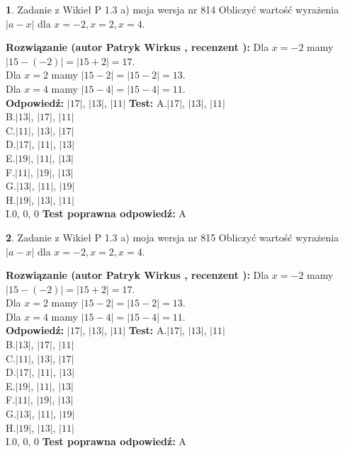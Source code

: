 \documentclass[12pt, a4paper]{article}
\theoremstyle{definition} %
\newtheorem{zad}{}
\newcommand{\zadStart}[1]{\begin{zad}#1\newline}
\newcommand{\zadStop}{\end{zad}}
\newcommand{\rozwStart}[2]{\noindent \textbf{Rozwiązanie (autor #1 , recenzent #2): }\newline}
\newcommand{\rozwStop}{\newline}
\newcommand{\odpStart}{\noindent \textbf{Odpowiedź:}\newline}
\newcommand{\odpStop}{\newline}
\newcommand{\testStart}{\noindent \textbf{Test:}\newline}
\newcommand{\testStop}{\newline}
\newcommand{\kluczStart}{\noindent \textbf{Test poprawna odpowiedź:}\newline}
\newcommand{\kluczStop}{\newline}
\begin{document}
\zadStart{Zadanie z Wikieł P 1.3 a) moja wersja nr 814}
Obliczyć wartość wyrażenia $|a - x|$ dla $x=-2,x=2,x=4$.
\zadStop
\rozwStart{Patryk Wirkus}{}
Dla $x = -2$ mamy $|15 - (-2)| = |15 + 2| = 17$.\\
Dla $x = 2$ mamy $|15 - 2| = |15 - 2| = 13$.\\
Dla $x = 4$ mamy $|15 - 4| = |15 - 4| = 11$.\\
\rozwStop
\odpStart
$|17|$, $|13|$, $|11|$
\odpStop
\testStart
A.$|17|$, $|13|$, $|11|$\\
B.$|13|$, $|17|$, $|11|$\\
C.$|11|$, $|13|$, $|17|$\\
D.$|17|$, $|11|$, $|13|$\\
E.$|19|$, $|11|$, $|13|$\\
F.$|11|$, $|19|$, $|13|$\\
G.$|13|$, $|11|$, $|19|$\\
H.$|19|$, $|13|$, $|11|$\\
I.$0$, $0$, $0$
\testStop
\kluczStart
A
\kluczStop



\zadStart{Zadanie z Wikieł P 1.3 a) moja wersja nr 815}
Obliczyć wartość wyrażenia $|a - x|$ dla $x=-2,x=2,x=4$.
\zadStop
\rozwStart{Patryk Wirkus}{}
Dla $x = -2$ mamy $|15 - (-2)| = |15 + 2| = 17$.\\
Dla $x = 2$ mamy $|15 - 2| = |15 - 2| = 13$.\\
Dla $x = 4$ mamy $|15 - 4| = |15 - 4| = 11$.\\
\rozwStop
\odpStart
$|17|$, $|13|$, $|11|$
\odpStop
\testStart
A.$|17|$, $|13|$, $|11|$\\
B.$|13|$, $|17|$, $|11|$\\
C.$|11|$, $|13|$, $|17|$\\
D.$|17|$, $|11|$, $|13|$\\
E.$|19|$, $|11|$, $|13|$\\
F.$|11|$, $|19|$, $|13|$\\
G.$|13|$, $|11|$, $|19|$\\
H.$|19|$, $|13|$, $|11|$\\
I.$0$, $0$, $0$
\testStop
\kluczStart
A
\kluczStop
\end{document}
